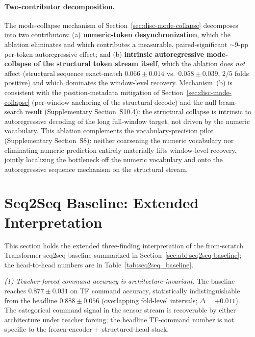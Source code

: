 \documentclass[11pt,a4paper]{article}
\begin{document}
\paragraph{Two-contributor decomposition.} The mode-collapse mechanism of Section~\ref{sec:disc-mode-collapse} decomposes into two contributors: (a) \textbf{numeric-token desynchronization}, which the ablation eliminates and which contributes a measurable, paired-significant $\sim$$9$-pp per-token autoregressive effect; and (b) \textbf{intrinsic autoregressive mode-collapse of the structural token stream itself}, which the ablation does \emph{not} affect (structural sequence exact-match $0.066 \pm 0.014$ vs.\ $0.058 \pm 0.039$, $2/5$ folds positive) and which dominates the window-level recovery. Mechanism~(b) is consistent with the position-metadata mitigation of Section~\ref{sec:disc-mode-collapse} (per-window anchoring of the structural decode) and the null beam-search result (Supplementary Section~S10.4): the structural collapse is intrinsic to autoregressive decoding of the long full-window target, not driven by the numeric vocabulary. This ablation complements the vocabulary-precision pilot (Supplementary Section~S8): neither coarsening the numeric vocabulary nor eliminating numeric prediction entirely materially lifts window-level recovery, jointly localizing the bottleneck off the numeric vocabulary and onto the autoregressive sequence mechanism on the structural stream.

\section{Seq2Seq Baseline: Extended Interpretation}
\label{app:seq2seq-detail}

This section holds the extended three-finding interpretation of the from-scratch
Transformer seq2seq baseline summarized in
Section~\ref{sec:abl-seq2seq-baseline}; the head-to-head numbers are in
Table~\ref{tab:seq2seq_baseline}.

\emph{(1) Teacher-forced command accuracy is architecture-invariant.} The baseline reaches $0.877 \pm 0.031$ on TF command accuracy, statistically indistinguishable from the headline $0.888 \pm 0.056$ (overlapping fold-level intervals; $\Delta = +0.011$). The categorical command signal in the sensor stream is recoverable by either architecture under teacher forcing; the headline TF-command number is not specific to the frozen-encoder + structured-head stack.
\end{document}
